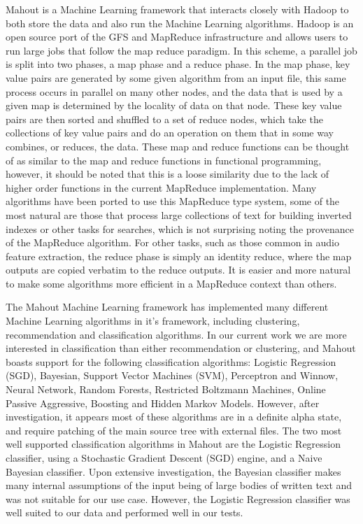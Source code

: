 Mahout is a Machine Learning framework that interacts closely with
Hadoop to both store the data and also run the Machine Learning
algorithms.  Hadoop is an open source port of the GFS
\cite{ghemawat03} and MapReduce \cite{dean08} infrastructure and
allows users to run large jobs that follow the map reduce paradigm.
In this scheme, a parallel job is split into two phases, a map phase
and a reduce phase.  In the map phase, key value pairs are generated
by some given algorithm from an input file, this same process occurs
in parallel on many other nodes, and the data that is used by a given
map is determined by the locality of data on that node.  These key
value pairs are then sorted and shuffled to a set of reduce nodes,
which take the collections of key value pairs and do an operation on
them that in some way combines, or reduces, the data.  These map and
reduce functions can be thought of as similar to the map and reduce
functions in functional programming, however, it should be noted that
this is a loose similarity due to the lack of higher order functions
in the current MapReduce implementation.  Many algorithms have been
ported to use this MapReduce type system, some of the most natural are
those that process large collections of text for building inverted
indexes or other tasks for searches, which is not surprising noting
the provenance of the MapReduce algorithm.  For other tasks, such as
those common in audio feature extraction, the reduce phase is simply
an identity reduce, where the map outputs are copied verbatim to the
reduce outputs.  It is easier and more natural to make some algorithms
more efficient in a MapReduce context than others.

The Mahout Machine Learning framework has implemented many different
Machine Learning algorithms in it's framework, including clustering,
recommendation and classification algorithms.  In our current work we
are more interested in classification than either recommendation or
clustering, and Mahout boasts support for the following classification
algorithms: Logistic Regression (SGD), Bayesian, Support Vector
Machines (SVM), Perceptron and Winnow, Neural Network, Random Forests,
Restricted Boltzmann Machines, Online Passive Aggressive, Boosting and
Hidden Markov Models.  However, after investigation, it appears most
of these algorithms are in a definite alpha state, and require
patching of the main source tree with external files.  The two most
well supported classification algorithms in Mahout are the Logistic
Regression classifier, using a Stochastic Gradient Descent (SGD)
engine, and a Naive Bayesian classifier.  Upon extensive
investigation, the Bayesian classifier makes many internal assumptions
of the input being of large bodies of written text and was not
suitable for our use case.  However, the Logistic Regression
classifier was well suited to our data and performed well in our
tests.

